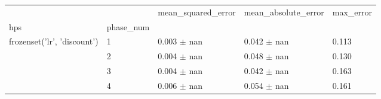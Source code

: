 \begin{tabular}{lllll}
\toprule
 &  & mean_squared_error & mean_absolute_error & max_error \\
hps & phase_num &  &  &  \\
\midrule
\multirow[t]{4}{*}{frozenset({'lr', 'discount'})} & 1 & 0.003 $\pm$ nan & 0.042 $\pm$ nan & 0.113 \\
 & 2 & 0.004 $\pm$ nan & 0.048 $\pm$ nan & 0.130 \\
 & 3 & 0.004 $\pm$ nan & 0.042 $\pm$ nan & 0.163 \\
 & 4 & 0.006 $\pm$ nan & 0.054 $\pm$ nan & 0.161 \\
\cline{1-5}
\bottomrule
\end{tabular}
